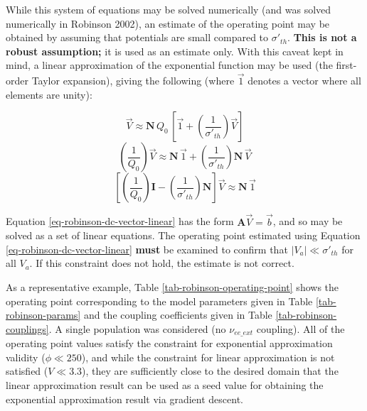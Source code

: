 While this system of equations may be solved numerically (and was solved
numerically in Robinson 2002), an estimate of the operating point may be
obtained by assuming that potentials are small compared to $\sigma'_{th}$.
\textbf{This is not a robust assumption;} it is used as an estimate only.
With this caveat kept in mind, a linear approximation of the exponential
function may be used (the first-order Taylor expansion), giving the following
(where $\vec{1}$ denotes a vector where all elements are unity):

\begin{equation}
\vec{V} \approx \mathbf{N} \, Q_0 \,
\left [ \vec{1} + \left ( \frac{1}{\sigma'_{th}} \right ) \vec{V} \right ]
\end{equation}
%
\begin{equation}
\left ( \frac{1}{Q_0} \right ) \vec{V} \approx \mathbf{N} \, \vec{1}
+ \left ( \frac{1}{\sigma'_{th}} \right ) \mathbf{N} \, \vec{V}
\end{equation}
%
\begin{equation}
\left [ \left ( \frac{1}{Q_0} \right ) \mathbf{I}
- \left ( \frac{1}{\sigma'_{th}} \right ) \mathbf{N}
\right ] \vec{V} \approx \mathbf{N} \, \vec{1}
\label{eq-robinson-dc-vector-linear}
\end{equation}

Equation \ref{eq-robinson-dc-vector-linear} has the form
$\mathbf{A} \vec{V} = \vec{b}$, and so may be solved as a set of linear
equations. The operating point estimated using Equation
\ref{eq-robinson-dc-vector-linear} \textbf{must} be examined to confirm
that $|V_a| \ll \sigma'_{th}$ for all $V_a$. If this constraint does not
hold, the estimate is not correct.

As a representative example, Table \ref{tab-robinson-operating-point} shows
the operating point corresponding to the model parameters given in Table
\ref{tab-robinson-params} and the coupling coefficients given in Table
\ref{tab-robinson-couplings}. A single population was considered (no
$\nu_{ee\_ext}$ coupling). All of the operating point values satisfy the
constraint for exponential approximation validity ($\phi \ll 250$), and
while the constraint for linear approximation is not satisfied
($V \ll 3.3$), they are sufficiently close to the desired domain that the
linear approximation result can be used as a seed value for obtaining the
exponential approximation result via gradient descent.


